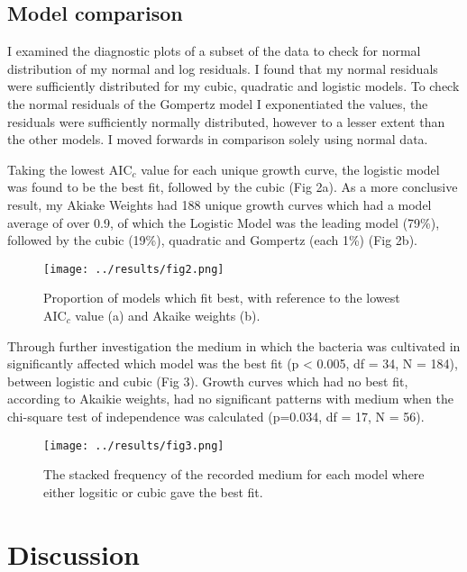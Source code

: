 \documentclass[11pt]{article}
\begin{document}
\subsection{Model comparison} 
I examined the diagnostic plots of a subset of the data to check for normal distribution of my normal and log residuals. I found that my normal residuals were sufficiently distributed for my cubic, quadratic and logistic models. To check the normal residuals of the Gompertz model I exponentiated the values, the residuals were sufficiently normally distributed, however to a lesser extent than the other models. I moved forwards in comparison solely using normal data. 

Taking the lowest AIC$_c$ value for each unique growth curve, the logistic model was found to be the best fit, followed by the cubic (Fig 2a). As a more conclusive result, my Akiake Weights had 188 unique growth curves which had a model average of over 0.9, of which the Logistic Model was the leading model (79\%), followed by the cubic (19\%), quadratic and Gompertz (each 1\%) (Fig 2b). 

\begin{figure}[htbp]
		\centering
		\texttt{[image: ../results/fig2.png]}
		\caption{Proportion of models which fit best, with reference to the lowest AIC$_c$ value (a) and Akaike weights (b).} 
		\label{Figure 2}
	\end{figure}
 

Through further investigation the medium in which the bacteria was cultivated in significantly affected which model was the best fit (p < 0.005, df = 34, N = 184), between logistic and cubic (Fig 3). Growth curves which had no best fit, according to Akaikie weights, had no significant patterns with medium when the chi-square test of independence was calculated (p=0.034, df = 17, N = 56). 

\begin{figure}[htbp]
		\centering
		\texttt{[image: ../results/fig3.png]}
		\caption{The stacked frequency of the recorded medium for each model where either logsitic or cubic gave the best fit.} 
		\label{Figure 3}
	\end{figure}



\section{Discussion}
\end{document}
